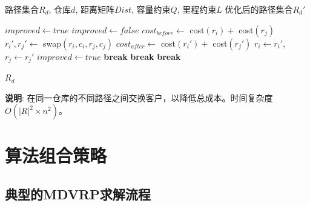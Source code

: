 \documentclass[12pt,a4paper]{article}
\begin{document}
\begin{algorithm}[H]
\caption{路径间客户交换（同仓库路径间优化）}
\label{alg:inter-route-exchange}
\begin{algorithmic}[1]
\REQUIRE 路径集合$R_d$, 仓库$d$, 距离矩阵$Dist$, 容量约束$Q$, 里程约束$L$
\ENSURE 优化后的路径集合$R_d'$

\STATE $improved \gets true$
    \STATE $improved \gets false$
                \STATE $cost_{before} \gets$ cost$(r_i) +$ cost$(r_j)$
                \STATE $r_i', r_j' \gets$ swap$(r_i, c_i, r_j, c_j)$  
                    \STATE $cost_{after} \gets$ cost$(r_i') +$ cost$(r_j')$
                        \STATE $r_i \gets r_i'$, $r_j \gets r_j'$
                        \STATE $improved \gets true$
                        \STATE \textbf{break}
                    \ENDIF
                \ENDIF
            \ENDFOR
                \STATE \textbf{break}
            \ENDIF
        \ENDFOR
            \STATE \textbf{break}
        \ENDIF
    \ENDFOR
\ENDWHILE

\RETURN $R_d$
\end{algorithmic}
\end{algorithm}

\textbf{说明}: 在同一仓库的不同路径之间交换客户，以降低总成本。时间复杂度$O(|R|^2 \times n^2)$。

\newpage

\section{算法组合策略}

\subsection{典型的MDVRP求解流程}
\end{document}
